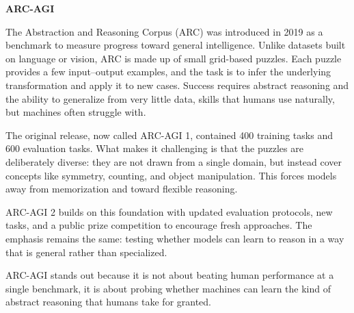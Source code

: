 \textbf{ARC-AGI}


The Abstraction and Reasoning Corpus (ARC) was introduced in 2019 as a benchmark to measure progress toward general intelligence. Unlike datasets 
built on language or vision, ARC is made up of small grid-based puzzles. Each puzzle provides a few input–output examples, and the task is to infer
the underlying transformation and apply it to new cases. Success requires abstract reasoning and the ability to generalize from very little
data, skills that humans use naturally, but machines often struggle with.

The original release, now called ARC-AGI 1, contained 400 training tasks and 600 evaluation tasks. What makes it challenging is that
the puzzles are deliberately diverse: they are not drawn from a single domain, but instead cover concepts like symmetry, counting, and object
manipulation. This forces models away from memorization and toward flexible reasoning.

ARC-AGI 2 builds on this foundation with updated evaluation protocols, new tasks, and a public prize competition to encourage fresh approaches.
The emphasis remains the same: testing whether models can learn to reason in a way that is general rather than specialized.

ARC-AGI stands out because it is not about beating human performance at a single benchmark, it is about probing whether machines can learn the
kind of abstract reasoning that humans take for granted.